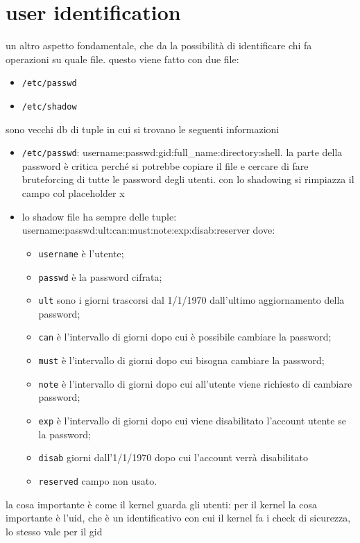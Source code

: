 \documentclass[12pt, oneside]{extbook} %
\begin{document}
\section{user identification}
un altro aspetto fondamentale, che da la possibilità di identificare chi fa operazioni su quale file. questo viene fatto con due file:
\begin{itemize}
\item \texttt{/etc/passwd}
\item \texttt{/etc/shadow}
\end{itemize}
sono vecchi db di tuple in cui si trovano le seguenti informazioni
\begin{itemize}
\item \texttt{/etc/passwd}: username:passwd:gid:full\_name:directory:shell. la parte della password è critica perché si potrebbe copiare il file e cercare di fare bruteforcing di tutte le password degli utenti. con lo shadowing si rimpiazza il campo col placeholder x
\item lo shadow file ha sempre delle tuple: username:passwd:ult:can:must:note:exp:disab:reserver dove:
\begin{itemize}
	\item \texttt{username} è l'utente;
	\item \texttt{passwd} è la password cifrata;
	\item \texttt{ult} sono i giorni trascorsi dal 1/1/1970 dall'ultimo aggiornamento della password;
	\item \texttt{can} è l'intervallo di giorni dopo cui è possibile cambiare la password;
	\item \texttt{must} è l'intervallo di giorni dopo cui bisogna cambiare la password;
	\item \texttt{note} è l'intervallo di giorni dopo cui all'utente viene richiesto di cambiare password;
	\item \texttt{exp} è l'intervallo di giorni dopo cui viene disabilitato l'account utente se la password;
	\item \texttt{disab} giorni dall'1/1/1970 dopo cui l'account verrà disabilitato
	\item \texttt{reserved} campo non usato.
\end{itemize}
\end{itemize}
la cosa importante è come il kernel guarda gli utenti: per il kernel la cosa importante è l'uid, che è un identificativo con cui il kernel fa i check di sicurezza, lo stesso vale per il gid
\end{document}
